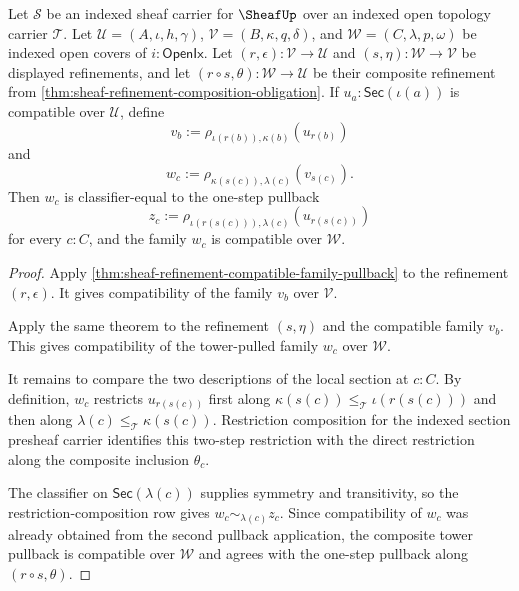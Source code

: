 \begin{theorem}
\label{thm:sheaf-refinement-pullback-composition}
Let $\mathcal{S}$ be an indexed sheaf carrier for $\SheafUp$ over an indexed open topology carrier $\mathcal{T}$. Let $\mathcal{U}=(A,\iota,h,\gamma)$, $\mathcal{V}=(B,\kappa,q,\delta)$, and $\mathcal{W}=(C,\lambda,p,\omega)$ be indexed open covers of $i:\mathsf{OpenIx}$. Let $(r,\epsilon):\mathcal{V}\to\mathcal{U}$ and $(s,\eta):\mathcal{W}\to\mathcal{V}$ be displayed refinements, and let $(r\circ s,\theta):\mathcal{W}\to\mathcal{U}$ be their composite refinement from \autoref{thm:sheaf-refinement-composition-obligation}. If $u_a:\mathsf{Sec}(\iota(a))$ is compatible over $\mathcal{U}$, define
$$
v_b:=\rho_{\iota(r(b)),\kappa(b)}(u_{r(b)})
$$
and
$$
w_c:=\rho_{\kappa(s(c)),\lambda(c)}(v_{s(c)}).
$$
Then $w_c$ is classifier-equal to the one-step pullback
$$
z_c:=\rho_{\iota(r(s(c))),\lambda(c)}(u_{r(s(c))})
$$
for every $c:C$, and the family $w_c$ is compatible over $\mathcal{W}$.
\end{theorem}
\begin{proof}
Apply \autoref{thm:sheaf-refinement-compatible-family-pullback} to the refinement $(r,\epsilon)$. It gives compatibility of the family $v_b$ over $\mathcal{V}$.

Apply the same theorem to the refinement $(s,\eta)$ and the compatible family $v_b$. This gives compatibility of the tower-pulled family $w_c$ over $\mathcal{W}$.

It remains to compare the two descriptions of the local section at $c:C$. By definition, $w_c$ restricts $u_{r(s(c))}$ first along $\kappa(s(c))\le_{\mathcal{T}}\iota(r(s(c)))$ and then along $\lambda(c)\le_{\mathcal{T}}\kappa(s(c))$. Restriction composition for the indexed section presheaf carrier identifies this two-step restriction with the direct restriction along the composite inclusion $\theta_c$.

The classifier on $\mathsf{Sec}(\lambda(c))$ supplies symmetry and transitivity, so the restriction-composition row gives $w_c\sim_{\lambda(c)}z_c$. Since compatibility of $w_c$ was already obtained from the second pullback application, the composite tower pullback is compatible over $\mathcal{W}$ and agrees with the one-step pullback along $(r\circ s,\theta)$.
\end{proof}

